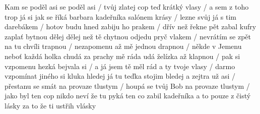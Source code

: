 \begin{TEXT}{Kam se poděl asi}
\SLOKA {} se poděl asi           /  tvůj zlatej cop \NL
{} teď krátký vlasy / a  sem z toho trop \NL
{} já si jak se říká \NL
{} barbara kadeřníka \NL
{} salónem krásy / lezne svůj  
\SLOKA já s tim darebákem / hotov budu hned \NL
zabiju ho prakem / dřív než řekne pět \NL
zabal kufry zaplať bytnou \NL
dělej dělej než tě chytnou \NL
odjedu pryč vlakem / nevrátím se zpět 
\SLOKA na tu chvíli trapnou / nezapomenu \NL
až mě jednou drapnou / někde v Jemenu \NL
neboť každá holka chudá \NL
za prachy mě ráda udá \NL
želízka až klapnou / pak si vzpomenu 
\SLOKA hezká bejvala si / a já jsem tě měl rád \NL
a ty tvoje vlasy / darmo vzpomínat \NL
jiného si kluka hledej \NL
já tu teďka stojim bledej \NL
a zejtra už asi / přestanu se smát 
\SLOKA na provaze tlustym / houpá se tvůj Bob \NL
na provaze tlustym / jako byl ten cop \NL
nikdo neví že tu pyká \NL
ten co zabil kadeřníka \NL
a to pouze z čistý lásky \NL
za to že ti ustřih vlásky
\end{TEXT}
